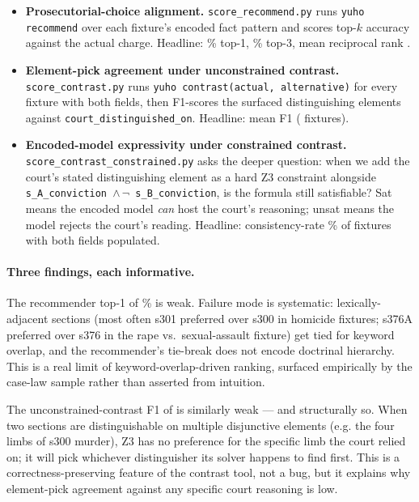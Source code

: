 \begin{itemize}
\item \textbf{Prosecutorial-choice alignment.}
\texttt{score\_recommend.py} runs \texttt{yuho recommend} over
each fixture's encoded fact pattern and scores top-$k$ accuracy
against the actual charge. Headline:
\statCaseLawTopOne{}\% top-1, \statCaseLawTopThree{}\% top-3,
mean reciprocal rank \statCaseLawMRR{}.
\item \textbf{Element-pick agreement under unconstrained
contrast.} \texttt{score\_contrast.py} runs
\texttt{yuho contrast(actual, alternative)} for every fixture
with both fields, then F1-scores the surfaced distinguishing
elements against \texttt{court\_distinguished\_on}. Headline:
mean F1 \statCaseLawContrastF{} (\statCaseLawContrastN{} fixtures).
\item \textbf{Encoded-model expressivity under
constrained contrast.}
\texttt{score\_contrast\_constrained.py} asks the deeper question:
when we add the court's stated distinguishing element as a hard
Z3 constraint alongside
\texttt{s\_A\_conviction $\land\,\lnot$ s\_B\_conviction}, is the
formula still satisfiable? Sat means the encoded model
\emph{can} host the court's reasoning; unsat means the model
rejects the court's reading. Headline: consistency-rate
\statCaseLawConsistency{}\% of \statCaseLawConsistencyN{}
fixtures with both fields populated.
\end{itemize}

\paragraph{Three findings, each informative.}

The recommender top-1 of \statCaseLawTopOne{}\% is weak. Failure
mode is systematic: lexically-adjacent sections (most often
\textsf{s301} preferred over \textsf{s300} in homicide fixtures;
\textsf{s376A} preferred over \textsf{s376} in the rape vs.\
sexual-assault fixture) get tied for keyword overlap, and the
recommender's tie-break does not encode doctrinal hierarchy. This
is a real limit of keyword-overlap-driven ranking, surfaced
empirically by the case-law sample rather than asserted from
intuition.

The unconstrained-contrast F1 of \statCaseLawContrastF{} is
similarly weak --- and structurally so. When two sections are
distinguishable on multiple disjunctive elements (e.g. the four
limbs of \textsf{s300} murder), Z3 has no preference for the
specific limb the court relied on; it will pick whichever
distinguisher its solver happens to find first. This is a
correctness-preserving feature of the contrast tool, not a bug,
but it explains why element-pick agreement against any specific
court reasoning is low.

